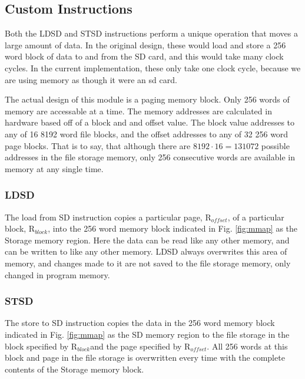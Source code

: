 \documentclass[../ProjectDocumentation.tex]{subfiles}
\newcommand{\blk}{R$_{block}$}
\newcommand{\off}{R$_{offset}$}
\begin{document}
\subsection{Custom Instructions}
Both the LDSD and STSD instructions perform a unique operation that moves a large amount of data. In the original design, these would load and store a 256 word block of data to and from the SD card, and this would take many clock cycles. In the current implementation, these only take one clock cycle, because we are using memory as though it were an sd card.

The actual design of this module is a paging memory block. Only 256 words of memory are accessable at a time. The memory addresses are calculated in hardware based off of a block and and offset value. The block value addresses to any of 16 8192 word file blocks, and the offset addresses to any of 32 256 word page blocks. That is to say, that although there are $8192\cdot16=131072$ possible addresses in the file storage memory, only 256 consecutive words are available in memory at any single time.

\subsubsection{LDSD}
The load from SD instruction copies a particular page, \off, of a particular block, \blk, into the 256 word memory block indicated in Fig. \ref{fig:mmap} as the Storage memory region. Here the data can be read like any other memory, and can be written to like any other memory. LDSD always overwrites this area of memory, and changes made to it are not saved to the file storage memory, only changed in program memory.

\subsubsection{STSD}
The store to SD instruction copies the data in the 256 word memory block indicated in Fig. \ref{fig:mmap} as the SD memory region to the file storage in the block specified by \blk and the page specified by \off. All 256 words at this block and page in the file storage is overwritten every time with the complete contents of the Storage memory block.
\end{document}
